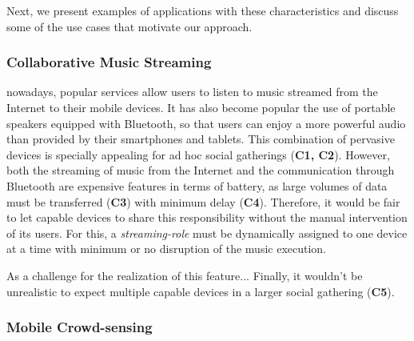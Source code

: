\begin{enumerate}[label=C\arabic*]
	
\end{enumerate}


Next, we present examples of applications with these characteristics and discuss some of the use cases that motivate our approach.

\subsubsection{\textbf{Collaborative Music Streaming}}

nowadays, popular services allow users to listen to music streamed from the Internet to their mobile devices. It has also become popular the use of portable speakers equipped with Bluetooth, so that users can enjoy a more powerful audio than provided by their smartphones and tablets. This combination of pervasive devices is specially appealing for ad hoc social gatherings (\textbf{C1, C2}). However, both the streaming of music from the Internet and the communication through Bluetooth are expensive features in terms of battery, as large volumes of data must be transferred (\textbf{C3}) with minimum delay (\textbf{C4}). Therefore, it would be fair to let capable devices to share this responsibility without the manual intervention of its users. For this, a \textit{streaming-role} must be dynamically assigned to one device at a time with minimum or no disruption of the music execution. 

As a challenge for the realization of this feature... Finally, it wouldn't be unrealistic to expect multiple capable devices in a larger social gathering  (\textbf{C5}).




\subsubsection{\textbf{Mobile Crowd-sensing}}

